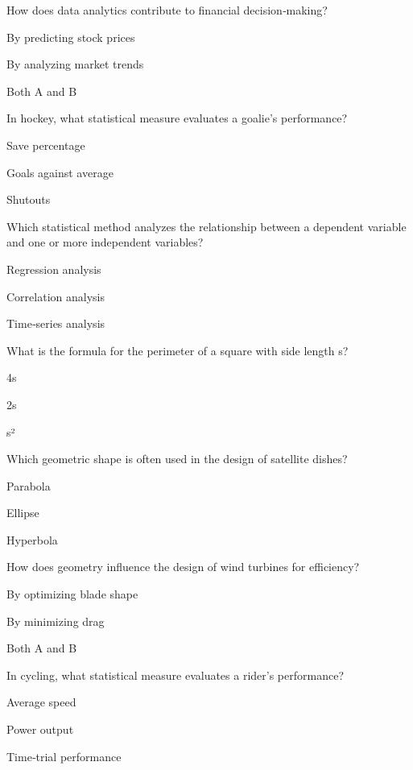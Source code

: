 \begin{enhancedmcq}{How does data analytics contribute to financial decision‑making?}
\item By predicting stock prices
\item By analyzing market trends
\item Both A and B

\end{enhancedmcq}
\begin{enhancedmcq}{In hockey, what statistical measure evaluates a goalie's performance?}
\item Save percentage
\item Goals against average
\item Shutouts

\end{enhancedmcq}
\begin{enhancedmcq}{Which statistical method analyzes the relationship between a dependent variable and one or more independent variables?}
\item Regression analysis
\item Correlation analysis
\item Time‑series analysis

\end{enhancedmcq}
\begin{enhancedmcq}{What is the formula for the perimeter of a square with side length s?}
\item 4s
\item 2s
\item s²

\end{enhancedmcq}
\begin{enhancedmcq}{Which geometric shape is often used in the design of satellite dishes?}
\item Parabola
\item Ellipse
\item Hyperbola

\end{enhancedmcq}
\begin{enhancedmcq}{How does geometry influence the design of wind turbines for efficiency?}
\item By optimizing blade shape
\item By minimizing drag
\item Both A and B

\end{enhancedmcq}
\begin{enhancedmcq}{In cycling, what statistical measure evaluates a rider's performance?}
\item Average speed
\item Power output
\item Time‑trial performance

\end{enhancedmcq}
